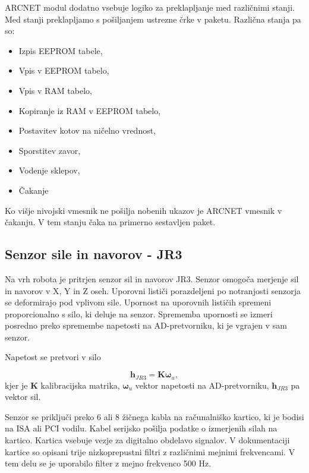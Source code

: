 \documentclass[a4paper]{article}
\begin{document}
ARCNET modul dodatno vsebuje logiko za preklapljanje med različnimi stanji. Med stanji preklapljamo s pošiljanjem ustrezne črke v paketu. Različna stanja pa so:

\begin{itemize}
	\item Izpis EEPROM tabele,
	\item Vpis v EEPROM tabelo,
	\item Vpis v RAM tabelo,
	\item Kopiranje iz RAM v EEPROM tabelo,
	\item Postavitev kotov na ničelno vrednost,	
	\item Sporstitev zavor,
	\item Vodenje sklepov,
	\item Čakanje
\end{itemize}

Ko višje nivojski vmesnik ne pošilja nobenih ukazov je ARCNET vmesnik v čakanju. V tem stanju čaka na primerno sestavljen paket.

\subsection{Senzor sile in navorov - JR3}

Na vrh robota je pritrjen senzor sil in navorov JR3. Senzor omogoča merjenje sil in navorov v X, Y in Z oseh. Uporovni lističi porazdeljeni po notranjosti senzorja se deformirajo pod vplivom sile. Upornost na uporovnih lističih spremeni proporcionalno s silo, ki deluje na senzor. Sprememba upornosti se izmeri posredno preko spremembe napetosti na AD-pretvorniku, ki je vgrajen v sam senzor. 

Napetost se pretvori v silo 

\begin{equation}
\textbf{h}_{JR3} = \textbf{K} \mathbf{\omega}_u,
\end{equation}
kjer je \textbf{K} kalibracijska matrika, $\mathbf{\omega}_u$ vektor napetosti na AD-pretvorniku, $\textbf{h}_{JR3}$ pa vektor sil.


Senzor se priključi preko 6 ali 8 žičnega kabla na računalniško kartico, ki je bodisi na ISA ali PCI vodilu. Kabel serijsko pošilja podatke o izmerjenih silah na kartico. Kartica vsebuje vezje za digitalno obdelavo signalov. V dokumentaciji kartice \cite{jr3_doc_inst} so opisani trije nizkoprepustni filtri z različnimi mejnimi frekvencami. V tem delu se je uporabilo filter z mejno frekvenco 500 Hz.
\end{document}
